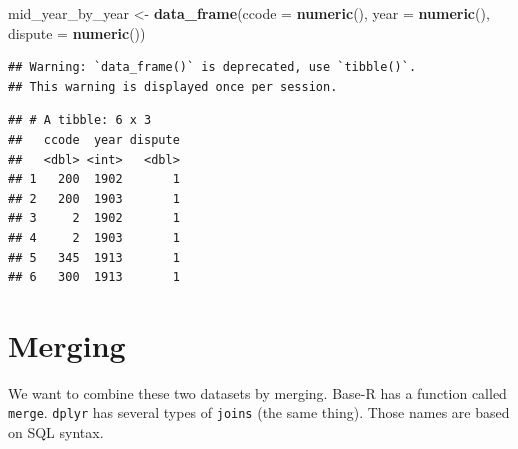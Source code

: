 \documentclass[]{book}
\newenvironment{Shaded}{\begin{snugshade}}{\end{snugshade}}
\newcommand{\KeywordTok}[1]{\textcolor[rgb]{0.13,0.29,0.53}{\textbf{#1}}}
\newcommand{\DataTypeTok}[1]{\textcolor[rgb]{0.13,0.29,0.53}{#1}}
\newcommand{\DecValTok}[1]{\textcolor[rgb]{0.00,0.00,0.81}{#1}}
\newcommand{\StringTok}[1]{\textcolor[rgb]{0.31,0.60,0.02}{#1}}
\newcommand{\ControlFlowTok}[1]{\textcolor[rgb]{0.13,0.29,0.53}{\textbf{#1}}}
\newcommand{\OperatorTok}[1]{\textcolor[rgb]{0.81,0.36,0.00}{\textbf{#1}}}
\newcommand{\NormalTok}[1]{#1}
\theoremstyle{definition}
\theoremstyle{definition}
\theoremstyle{definition}
\theoremstyle{remark}
\begin{document}
\begin{Shaded}
\begin{Highlighting}[]
\NormalTok{mid_year_by_year <-}\StringTok{ }\KeywordTok{data_frame}\NormalTok{(}\DataTypeTok{ccode =} \KeywordTok{numeric}\NormalTok{(),}
                               \DataTypeTok{year =} \KeywordTok{numeric}\NormalTok{(),}
                               \DataTypeTok{dispute =} \KeywordTok{numeric}\NormalTok{())}
\end{Highlighting}
\end{Shaded}

\begin{verbatim}
## Warning: `data_frame()` is deprecated, use `tibble()`.
## This warning is displayed once per session.
\end{verbatim}

\begin{Shaded}
\end{Shaded}

\begin{verbatim}
## # A tibble: 6 x 3
##   ccode  year dispute
##   <dbl> <int>   <dbl>
## 1   200  1902       1
## 2   200  1903       1
## 3     2  1902       1
## 4     2  1903       1
## 5   345  1913       1
## 6   300  1913       1
\end{verbatim}

\section{Merging}\label{merging}

We want to combine these two datasets by merging. Base-R has a function
called \texttt{merge}. \texttt{dplyr} has several types of
\texttt{joins} (the same thing). Those names are based on SQL syntax.
\end{document}
